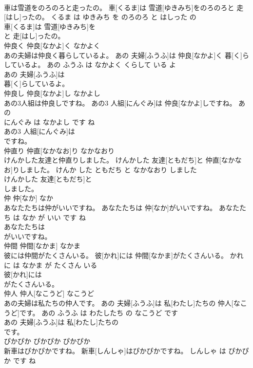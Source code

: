 \documentclass[8pt]{extreport}
\begin{document}
\begin{CJK}{UTF8}{min}
\\	車は雪道をのろのろと走ったの。	車[くるま]は 雪道[ゆきみち]をのろのろと 走[はし]ったの。	くるま は ゆきみち を のろのろ と はしった の	
\\	車[くるま]は 雪道[ゆきみち]を
\\	と 走[はし]ったの。			
\\	仲良く	仲良[なかよ]く	なかよく	
\\	あの夫婦は仲良く暮らしているよ。	あの 夫婦[ふうふ]は 仲良[なかよ]く 暮[く]らしているよ。	あの ふうふ は なかよく くらして いる よ	
\\	あの 夫婦[ふうふ]は
\\	暮[く]らしているよ。			
\\	仲良し	仲良[なかよ]し	なかよし	
\\	あの3人組は仲良しですね。	あの3 人組[にんぐみ]は 仲良[なかよ]しですね。	あの 
\\	にんぐみ は なかよし です ね	
\\	あの3 人組[にんぐみ]は
\\	ですね。			
\\	仲直り	仲直[なかなお]り	なかなおり	
\\	けんかした友達と仲直りしました。	けんかした 友達[ともだち]と 仲直[なかなお]りしました。	けんか した ともだち と なかなおり しました	
\\	けんかした 友達[ともだち]と
\\	しました。			
\\	仲	仲[なか]	なか	
\\	あなたたちは仲がいいですね。	あなたたちは 仲[なか]がいいですね。	あなたたち は なか が いい です ね	
\\	あなたたちは
\\	がいいですね。			
\\	仲間	仲間[なかま]	なかま	
\\	彼には仲間がたくさんいる。	彼[かれ]には 仲間[なかま]がたくさんいる。	かれ に は なかま が たくさん いる	
\\	彼[かれ]には
\\	がたくさんいる。			
\\	仲人	仲人[なこうど]	なこうど	
\\	あの夫婦は私たちの仲人です。	あの 夫婦[ふうふ]は 私[わたし]たちの 仲人[なこうど]です。	あの ふうふ は わたしたち の なこうど です	
\\	あの 夫婦[ふうふ]は 私[わたし]たちの
\\	です。			
\\	ぴかぴか	ぴかぴか	ぴかぴか	
\\	新車はぴかぴかですね。	新車[しんしゃ]はぴかぴかですね。	しんしゃ は ぴかぴか です ね	

\end{CJK}
\end{document}
